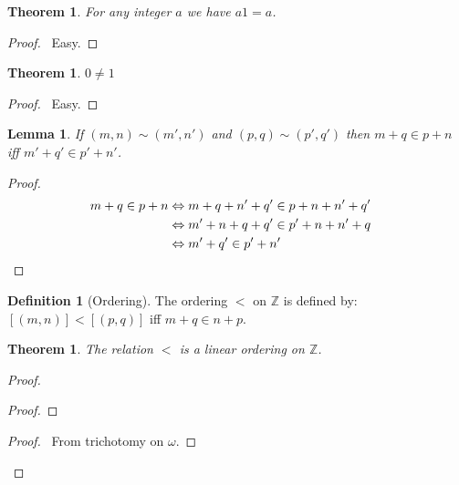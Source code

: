\documentclass{article}
\let\qed\relax
\newtheorem{lemma}[axiom]{Lemma}
\newtheorem{theorem}[axiom]{Theorem}
\theoremstyle{definition}
\newtheorem{definition}[axiom]{Definition}
\begin{document}
    \begin{theorem}
        For any integer $a$ we have $a1= a$.
    \end{theorem}

    \begin{proof}
        \pf\ Easy. \qed
    \end{proof}

    \begin{theorem}
        $0 \neq 1$
    \end{theorem}

    \begin{proof}
        \pf\ Easy. \qed
    \end{proof}

    \begin{lemma}
        If $(m,n) \sim (m',n')$ and $(p,q) \sim (p',q')$ then $m + q \in p + n$ iff
        $m' + q' \in p' + n'$.
    \end{lemma}

    \begin{proof}
        \pf
        \begin{align*}
            m + q \in p + n & \Leftrightarrow m + q + n' + q' \in p + n + n' + q' \\
            & \Leftrightarrow m' + n + q + q' \in p' + n + n' + q \\
            & \Leftrightarrow m' + q' \in p' + n' & \qed
        \end{align*}
    \end{proof}

    \begin{definition}[Ordering]
        The ordering $<$ on $\mathbb{Z}$ is defined by: $[(m,n)] < [(p,q)]$ iff $m + q \in n + p$.
    \end{definition}

    \begin{theorem}
        The relation $<$ is a linear ordering on $\mathbb{Z}$.
    \end{theorem}

    \begin{proof}
        \pf
        \begin{proof}
        \end{proof}
        \begin{proof}
            \pf\ From trichotomy on $\omega$.
        \end{proof}
        \qed
    \end{proof}
\end{document}
